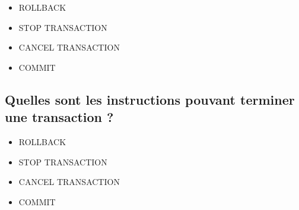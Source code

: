 \documentclass[11pt,a4paper]{article}
\begin{document}
\begin{itemize}
\item[\CaseCoche] ROLLBACK \\  %
\item[\CaseCoche] STOP TRANSACTION \\
\item[\CaseCoche] CANCEL TRANSACTION \\
\item[\CaseCoche] COMMIT \\
\end{itemize}


\subsection{Quelles sont les instructions pouvant terminer une transaction ?}

\begin{itemize}
\item[\CaseCoche] ROLLBACK \\  %
\item[\CaseCoche] STOP TRANSACTION \\
\item[\CaseCoche] CANCEL TRANSACTION \\
\item[\CaseCoche] COMMIT \\  %
\end{itemize}
\end{document}
